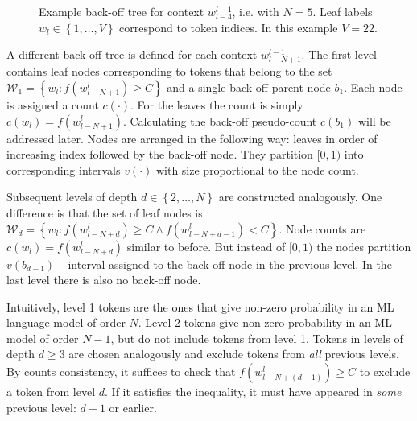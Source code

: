 \documentclass[draft]{IIBproject}
\makeatletter
\DeclareRobustCommand*{\ie}{i.e.\@\xspace}
\makeatother
\begin{document}
\begin{figure}[h]
\caption{\label{fig:backoff_tree}Example back-off tree for context $w_{l-4}^{l-1}$, \ie with $N=5$. Leaf labels $w_l \in \left\{ 1, \dots, V \right\}$ correspond to token indices. In this example $V=22$.}
\end{figure}

A different back-off tree is defined for each context $w_{l-N+1}^{l-1}$. The first level contains leaf nodes corresponding to tokens that belong to the set $\mathcal W_1 = \left\{ w_l : f(w_{l-N+1}^l) \ge C \right\}$ and a single back-off parent node $b_1$. Each node is assigned a count $c(\cdot)$. For the leaves the count is simply $c(w_l) = f(w_{l-N+1}^l)$. Calculating the back-off pseudo-count $c(b_1)$ will be addressed later. Nodes are arranged in the following way: leaves in order of increasing index followed by the back-off node. They partition $[0,1)$ into corresponding intervals $v(\cdot)$ with size proportional to the node count.

Subsequent levels of depth $d \in \left\{ 2, \dots, N \right\}$ are constructed analogously. One difference is that the set of leaf nodes is $\mathcal W_d = \left\{ w_l : f(w_{l-N+d}^l) \ge C \land f(w_{l-N+d-1}^l) < C \right\}$. Node counts are $c(w_l) = f(w_{l-N+d}^l)$ similar to before. But instead of $[0,1)$ the nodes partition $v(b_{d-1})$ -- interval assigned to the back-off node in the previous level. In the last level there is also no back-off node.

Intuitively, level 1 tokens are the ones that give non-zero probability in an ML language model of order $N$. Level 2 tokens give non-zero probability in an ML model of order $N-1$, but do not include tokens from level 1. Tokens in levels of depth $d \ge 3$ are chosen analogously and exclude tokens from \emph{all} previous levels. By counts consistency, it suffices to check that $f(w_{l-N+(d-1)}^l) \ge C$ to exclude a token from level $d$. If it satisfies the inequality, it must have appeared in \emph{some} previous level: $d-1$ or earlier.
\end{document}
